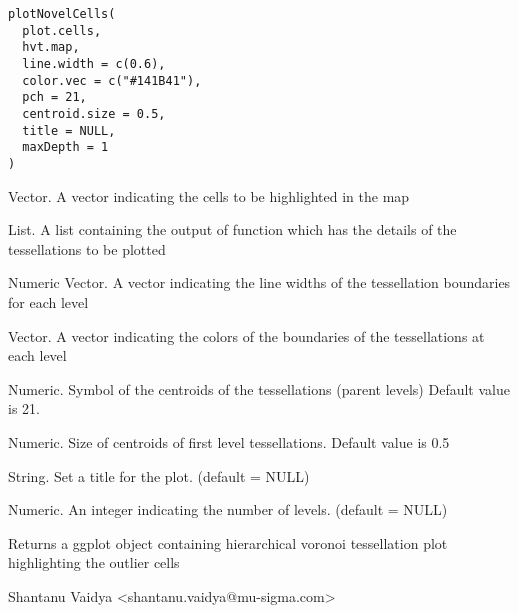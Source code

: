 \documentclass[letterpaper]{book}
\begin{document}
%
\begin{Usage}
\begin{verbatim}
plotNovelCells(
  plot.cells,
  hvt.map,
  line.width = c(0.6),
  color.vec = c("#141B41"),
  pch = 21,
  centroid.size = 0.5,
  title = NULL,
  maxDepth = 1
)
\end{verbatim}
\end{Usage}
%
\begin{Arguments}
\begin{ldescription}
\item[\code{plot.cells}] Vector. A vector indicating the cells to be highlighted in the map

\item[\code{hvt.map}] List. A list containing the output of  function
which has the details of the tessellations to be plotted

\item[\code{line.width}] Numeric Vector. A vector indicating the line widths of the
tessellation boundaries for each level

\item[\code{color.vec}] Vector. A vector indicating the colors of the boundaries of
the tessellations at each level

\item[\code{pch}] Numeric. Symbol of the centroids of the tessellations
(parent levels) Default value is 21.

\item[\code{centroid.size}] Numeric. Size of centroids of first level
tessellations. Default value is 0.5

\item[\code{title}] String. Set a title for the plot. (default = NULL)

\item[\code{maxDepth}] Numeric. An integer indicating the number of levels. (default = NULL)
\end{ldescription}
\end{Arguments}
%
\begin{Value}
Returns a ggplot object containing hierarchical voronoi tessellation plot
highlighting the outlier cells
\end{Value}
%
\begin{Author}
Shantanu Vaidya <shantanu.vaidya@mu-sigma.com>
\end{Author}
%
\begin{SeeAlso}
 \\{} 
\end{SeeAlso}
\end{document}
